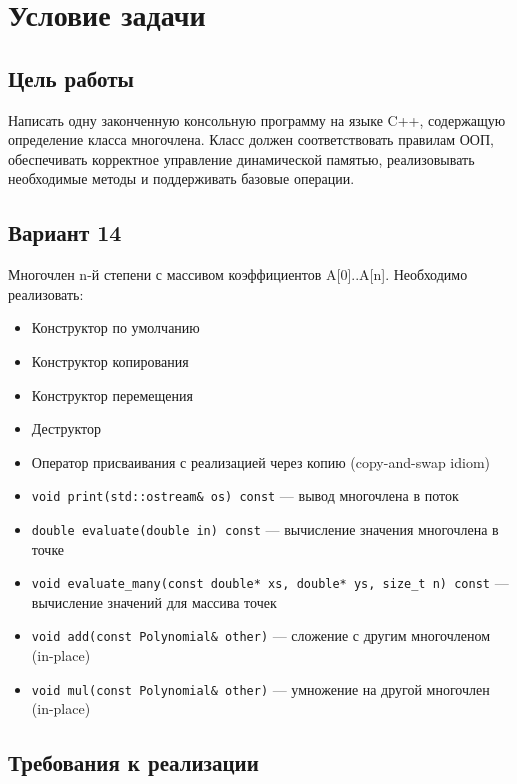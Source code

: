 \section{Условие задачи}

\subsection{Цель работы}

Написать одну законченную консольную программу на языке C++, содержащую определение класса многочлена. Класс должен соответствовать правилам ООП, обеспечивать корректное управление динамической памятью, реализовывать необходимые методы и поддерживать базовые операции.

\subsection{Вариант 14}

Многочлен n-й степени с массивом коэффициентов A[0]..A[n]. Необходимо реализовать:

\begin{itemize}
  \item Конструктор по умолчанию
  \item Конструктор копирования
  \item Конструктор перемещения
  \item Деструктор
  \item Оператор присваивания с реализацией через копию (copy-and-swap idiom)
  \item \texttt{void print(std::ostream\& os) const} — вывод многочлена в поток
  \item \texttt{double evaluate(double in) const} — вычисление значения многочлена в точке
  \item \texttt{void evaluate\_many(const double* xs, double* ys, size\_t n) const} — вычисление значений для массива точек
  \item \texttt{void add(const Polynomial\& other)} — сложение с другим многочленом (in-place)
  \item \texttt{void mul(const Polynomial\& other)} — умножение на другой многочлен (in-place)
\end{itemize}

\subsection{Требования к реализации}

